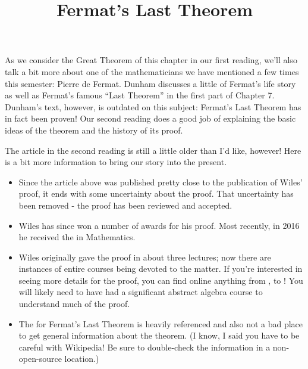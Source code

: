 \documentclass[nooutcomes]{ximera}
\title{Fermat's Last Theorem}
\begin{document}
\begin{abstract}
    
\end{abstract}
\maketitle

As we consider the Great Theorem of this chapter in our first reading,
we'll also talk a bit more about one of the mathematicians we have
mentioned a few times this semester: Pierre de Fermat.  Dunham discusses 
a little of Fermat's life story as well as Fermat's famous ``Last Theorem'' 
in the first part of Chapter 7. Dunham's text, however, is outdated on 
this subject: Fermat's Last Theorem has in fact been proven!  Our second
reading does a good job of explaining the basic ideas of the theorem
and the history of its proof.

The article in the second reading is still a little older than I'd like, 
however!  Here is a bit more information to bring our story into the present.
\begin{itemize}
	\item Since the article above was published pretty close to
          the publication of Wiles' proof, it ends with some
          uncertainty about the proof.  That uncertainty has been
          removed - the proof has been reviewed and accepted.
	\item Wiles has since won a number of awards for his proof.  Most recently, in 2016 he received the  in Mathematics.  
	\item Wiles originally gave the proof in about three lectures; now 
	there are instances of entire courses being devoted to the matter.  
	If you're interested in seeing more details for the proof, you can find online anything from 
	, 
	to !
	You will likely need to have had a significant abstract algebra course to understand much of the proof.
	\item The  for Fermat's Last Theorem is heavily referenced and also not a bad place to get general information about the theorem.  (I know, I said you have to be careful with Wikipedia!  Be sure to double-check the information in a non-open-source location.)
\end{itemize}
\end{document}
